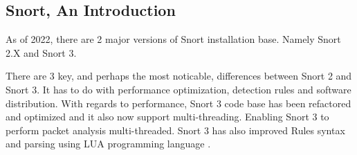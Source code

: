 \subsection{Snort, An Introduction}

As of 2022, there are 2 major versions of Snort installation base. Namely Snort 2.X and Snort 3.

There are 3 key, and perhaps the most noticable, differences between Snort 2 and Snort 3. It has to do with performance optimization, detection rules and software distribution. With regards to performance, Snort 3 code base has been refactored and optimized and it also now support multi-threading. Enabling Snort 3 to perform packet analysis multi-threaded. Snort 3 has also improved Rules syntax and parsing using LUA programming language \cite{}.